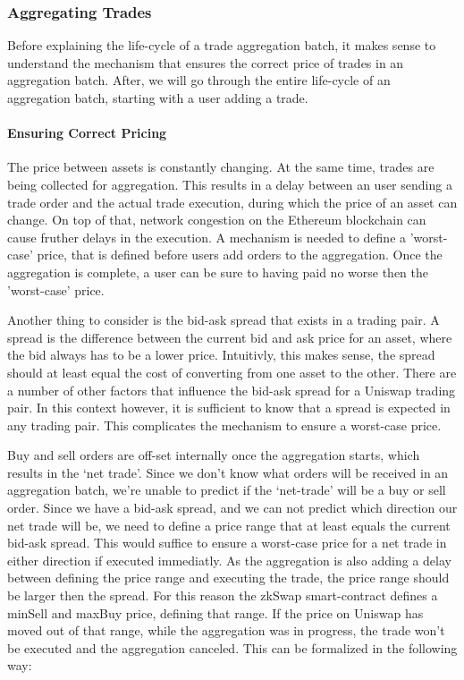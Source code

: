 \documentclass[../../thesis.tex]{subfiles}
\begin{document}
\subsubsection{Aggregating Trades}
Before explaining the life-cycle of a trade aggregation batch, it makes sense to understand the mechanism that ensures the correct price of trades in an aggregation batch. After, we will go through the entire life-cycle of an aggregation batch, starting with a user adding a trade. 

\paragraph{Ensuring Correct Pricing}
The price between assets is constantly changing. At the same time, trades are being collected for aggregation. This results in a delay between an user sending a trade order and the actual trade execution, during which the price of an asset can change. On top of that, network congestion on the Ethereum blockchain can cause fruther delays in the execution. A mechanism is needed to define a 'worst-case' price, that is defined before users add orders to the aggregation. Once the aggregation is complete, a user can be sure to having paid no worse then the 'worst-case' price.

Another thing to consider is the bid-ask spread that exists in a trading pair. A spread is the difference between the current bid and ask price for an asset, where the bid always has to be a lower price. Intuitivly, this makes sense, the spread should at least equal the cost of converting from one asset to the other. There are a number of other factors that influence the bid-ask spread for a Uniswap trading pair. In this context however, it is sufficient to know that a spread is expected in any trading pair. This complicates the mechanism to ensure a worst-case price. 

Buy and sell orders are off-set internally once the aggregation starts, which results in the `net trade'. Since we don't know what orders will be received in an aggregation batch, we're unable to predict if the `net-trade' will be a buy or sell order. Since we have a bid-ask spread, and we can not predict which direction our net trade will be, we need to define a price range that at least equals the current bid-ask spread. This would suffice to ensure a worst-case price for a net trade in either direction if executed immediatly.
As the aggregation is also adding a delay between defining the price range and executing the trade, the price range should be larger then the spread. For this reason the zkSwap smart-contract defines a minSell and maxBuy price, defining that range. If the price on Uniswap has moved out of that range, while the aggregation was in progress, the trade won't be executed and the aggregation canceled. This can be formalized in the following way: 
\end{document}
